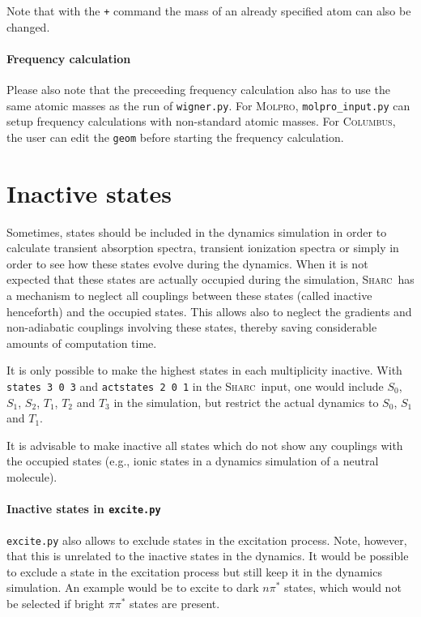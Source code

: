 \documentclass[a4paper,11pt,DIV=15,openany]{scrbook}
\newcommand{\sharc}{\textsc{Sharc}}
\newcommand{\ttt}[1]{\texttt{#1}}
\begin{document}
\normalsize
Note that with the \ttt{+} command the mass of an already specified atom can also be changed. 

\paragraph{Frequency calculation}

Please also note that the preceeding frequency calculation also has to use the same atomic masses as the run of \ttt{wigner.py}. For \textsc{Molpro}, \ttt{molpro\_input.py} can setup frequency calculations with non-standard atomic masses. For \textsc{Columbus}, the user can edit the \ttt{geom} before starting the frequency calculation.


\section{Inactive states}

Sometimes, states should be included in the dynamics simulation in order to calculate transient absorption spectra, transient ionization spectra or simply in order to see how these states evolve during the dynamics. When it is not expected that these states are actually occupied during the simulation, \sharc\ has a mechanism to neglect all couplings between these states (called inactive henceforth) and the occupied states. This allows also to neglect the gradients and non-adiabatic couplings involving these states, thereby saving considerable amounts of computation time. 

It is only possible to make the highest states in each multiplicity inactive. With \ttt{states 3 0 3} and \ttt{actstates 2 0 1} in the \sharc\ input, one would include $S_0$, $S_1$, $S_2$, $T_1$, $T_2$ and $T_3$ in the simulation, but restrict the actual dynamics to $S_0$, $S_1$ and $T_1$.

It is advisable to make inactive all states which do not show any couplings with the occupied states (e.g., ionic states in a dynamics simulation of a neutral molecule). 

\paragraph{Inactive states in \ttt{excite.py}}

\ttt{excite.py} also allows to exclude states in the excitation process. Note, however, that this is unrelated to the inactive states in the dynamics. It would be possible to exclude a state in the excitation process but still keep it in the dynamics simulation. An example would be to excite to dark $n\pi^*$ states, which would not be selected if bright $\pi\pi^*$ states are present.
\end{document}
